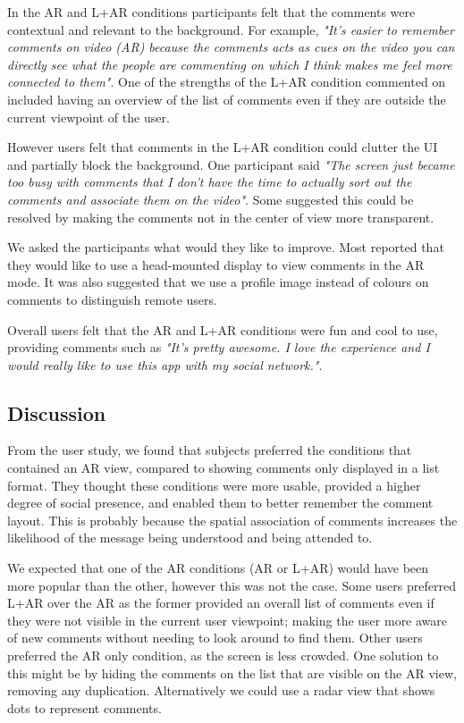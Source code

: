 In the AR and L+AR conditions participants felt that the comments were contextual and relevant to the background. For example, \textit{"It's easier to remember comments on video (AR) because the comments acts as cues on the video you can directly see what the people are commenting on which I think makes me feel more connected to them"}. One of the strengths of the L+AR condition commented on included having an overview of the list of comments even if they are outside the current viewpoint of the user. 

However users felt that comments in the L+AR condition could clutter the UI and partially block the background. One participant said \textit{"The screen just became too busy with comments that I don't have the time to actually sort out the comments and associate them on the video"}. Some suggested this could be resolved by making the comments not in the center of view more transparent.
 
We asked the participants what would they like to improve. Most reported that they would like to use a head-mounted display to view comments in the AR mode.  It was also suggested that we use a profile image instead of colours on comments to distinguish remote users.
 
Overall users felt that the AR and L+AR conditions were fun and cool to use, providing comments such as \textit{"It's pretty awesome. I love the experience and I would really like to use this app with my social network."}.


\subsection{Discussion}

From the user study, we found that subjects preferred the conditions that contained an AR view, compared to showing comments only displayed in a list format. They thought these conditions were more usable, provided a higher degree of social presence, and enabled them to better remember the comment layout. This is probably because the spatial association of comments increases the likelihood of the message being understood and being attended to.

We expected that one of the AR conditions (AR or L+AR) would have been more popular than the other, however this was not the case. Some users preferred L+AR over the AR as the former provided an overall list of comments even if they were not visible in the current user viewpoint; making the user more aware of new comments without needing to look around to find them. Other users preferred the AR only condition, as the screen is less crowded. One solution to this might be by hiding the comments on the list that are visible on the AR view, removing any duplication. Alternatively we could use a radar view that shows dots to represent comments. 

